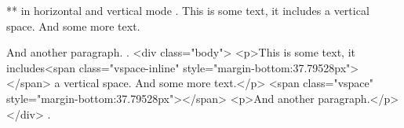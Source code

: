 ** \vspace{} in horizontal and vertical mode
.
This is some text, it includes\vspace{1cm} a vertical space. And some more text.

\vspace{1cm}
And another paragraph.
.
<div class="body">
<p>This is some text, it includes<span class="vspace-inline" style="margin-bottom:37.79528px"></span> a vertical space. And some more text.</p>
<span class="vspace" style="margin-bottom:37.79528px"></span>
<p>And another paragraph.</p>
</div>
.

